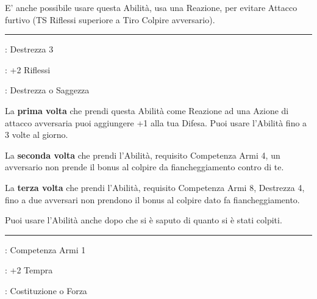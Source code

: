 \begin{multicols}{2}
E' anche possibile usare questa Abilità, usa una Reazione, per evitare Attacco furtivo (TS Riflessi superiore a Tiro Colpire avversario).


\smallskip\noindent\rule{\linewidth}{2pt} \hypertarget{Schivata prodigiosa}{}\medskip{}
\noindent
\begin{description}[noitemsep, topsep=0pt, parsep=0pt, partopsep=0pt, leftmargin=0cm, labelwidth=2.5cm]
    \item[\textbf{Requisito}]: Destrezza 3
    \item[\textbf{Tiri Salvezza}]: +2 Riflessi
    \item[\textbf{Caratteristica}]: Destrezza o Saggezza
\end{description}

La \textbf{prima volta} che prendi questa Abilità come Reazione ad una Azione di attacco avversaria puoi aggiungere +1 alla tua Difesa. Puoi usare l'Abilità fino a 3 volte al giorno.

La \textbf{seconda volta} che prendi l'Abilità, requisito Competenza Armi 4, un avversario non prende il bonus al colpire da fiancheggiamento contro di te.

La \textbf{terza volta} che prendi l'Abilità, requisito Competenza Armi 8, Destrezza 4, fino a due avversari non prendono il bonus al colpire dato fa fiancheggiamento.

Puoi usare l'Abilità anche dopo che si è saputo di quanto si è stati colpiti.

\smallskip\noindent\rule{\linewidth}{2pt} \hypertarget{Seconda pelle}{}\medskip{}
\noindent
\begin{description}[noitemsep, topsep=0pt, parsep=0pt, partopsep=0pt, leftmargin=0cm, labelwidth=2.5cm]
    \item[\textbf{Requisito}]: Competenza Armi 1
    \item[\textbf{Tiri Salvezza}]: +2 Tempra
    \item[\textbf{Caratteristica}]: Costituzione o Forza
\end{description}


\end{multicols}
